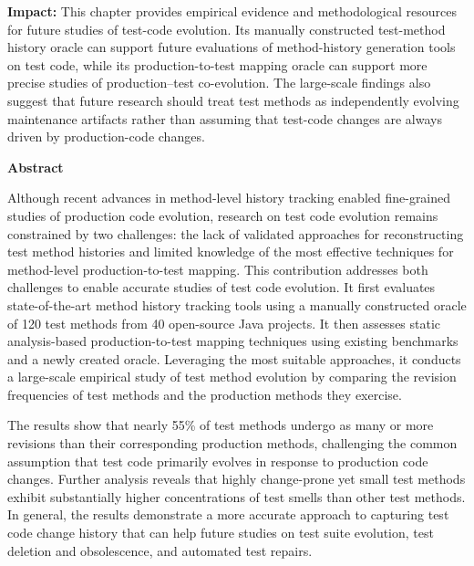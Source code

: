 \textbf{Impact:} This chapter provides empirical evidence and methodological resources for future studies of test-code evolution. Its manually constructed test-method history oracle can support future evaluations of method-history generation tools on test code, while its production-to-test mapping oracle can support more precise studies of production--test co-evolution. The large-scale findings also suggest that future research should treat test methods as independently evolving maintenance artifacts rather than assuming that test-code changes are always driven by production-code changes.


\clearpage

\begin{center}
{\Large\bfseries Abstract}
\end{center}
Although recent advances in method-level history tracking enabled fine-grained studies of production code evolution, research on test code evolution remains constrained by two challenges: the lack of validated approaches for reconstructing test method histories and limited knowledge of the most effective techniques for method-level production-to-test mapping. This contribution addresses both challenges to enable accurate studies of test code evolution. It first evaluates state-of-the-art method history tracking tools using a manually constructed oracle of 120 test methods from 40 open-source Java projects. It then assesses static analysis-based production-to-test mapping techniques using existing benchmarks and a newly created oracle. Leveraging the most suitable approaches, it conducts a large-scale empirical study of test method evolution by comparing the revision frequencies of test methods and the production methods they exercise.

The results show that nearly 55\% of test methods undergo as many or more revisions than their corresponding production methods, challenging the common assumption that test code primarily evolves in response to production code changes. Further analysis reveals that highly change-prone yet small test methods exhibit substantially higher concentrations of test smells than other test methods. In general, the results demonstrate a more accurate approach to capturing test code change history that can help future studies on test suite evolution, test deletion and obsolescence, and automated test repairs.


